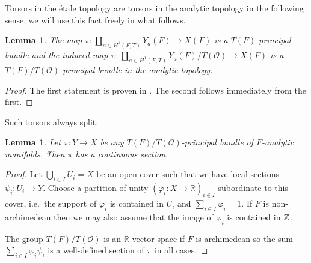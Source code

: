 \documentclass[a4paper,11pt,reqno]{amsart}
\newcommand{\R}{\mathbb{R}}
\newtheorem{lemma}[theorem]{Lemma}
\theoremstyle{definition}
\begin{document}
Torsors in the \'etale topology are torsors in the analytic topology in the following sense, we will use this fact freely in what follows.
\begin{lemma}
	The map $\pi:\coprod_{a \in H^1(F, T)} Y_{a}(F) \to X(F)$ is a $T(F)$-principal bundle and the induced map $\pi:\coprod_{a \in H^1(F, T)} Y_{a}(F)/T(\mathcal{O}) \to X(F)$ is a $T(F)/T(\mathcal{O})$-principal bundle in the analytic topology.
	\label{Torsors are principal bundles in the analytic topology}
\end{lemma}
\begin{proof}
	The first statement is proven in \cite[p. 127]{Salberger1998Tamagawa}. The second follows immediately from the first.
\end{proof}
Such torsors always split.
\begin{lemma}
 	Let $\pi: Y \to X$ be any $T(F)/T(\mathcal{O})$-principal bundle of $F$-analytic manifolds. Then $\pi$ has a continuous section.
	\label{Metrics always exist}
\end{lemma}
\begin{proof}
	Let $\bigcup_{i \in I} U_i = X$ be an open cover such that we have local sections $\psi_i: U_i \to Y$. Choose a partition of unity $(\varphi_i: X \to \R)_{i \in I}$ subordinate to this cover, i.e.~the support of $\varphi_i$ is contained in $U_i$ and $\sum_{i \in I} \varphi_i = 1$. If $F$ is non-archimedean then we may also assume that the image of $\varphi_i$ is contained in $\mathbb{Z}$.
	
	The group $T(F)/T(\mathcal{O})$ is an $\R$-vector space if $F$ is archimedean so the sum $\sum_{i \in I} \varphi_i \psi_i$ is a well-defined section of $\pi$ in all cases.
\end{proof}
\end{document}
